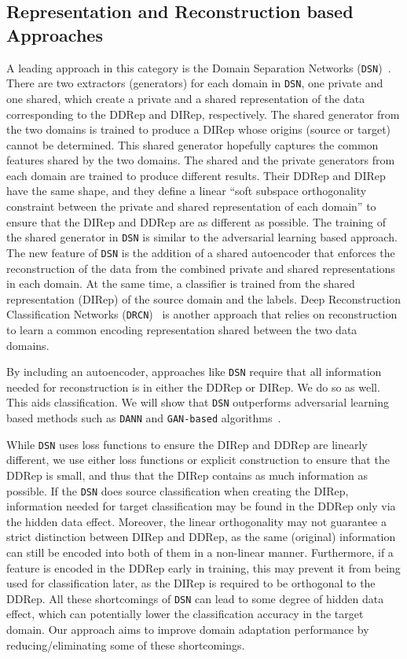 \documentclass{article}
\begin{document}
\subsection{Representation and Reconstruction based Approaches} \label{recon} A leading approach in this category is the Domain Separation Networks (\verb"DSN")~\cite{bousmalis2016domain}. There are two extractors (generators) for each domain in \verb"DSN", one private and one shared, which create a private and a shared representation of the data corresponding to the DDRep and DIRep, respectively. The shared generator from the two domains is trained to produce a DIRep whose origins (source or target) cannot be determined. This shared generator hopefully captures the common features shared by the two domains. The shared and the private generators from each domain are trained to produce different results. Their DDRep and DIRep have the same shape, and they define a linear ``soft subspace orthogonality constraint between the private and shared representation of each domain'' to ensure that the DIRep and DDRep are as different as possible. The training of the shared generator in \verb"DSN" is similar to the adversarial learning based approach. The new feature of \verb"DSN" is the addition of a shared autoencoder that enforces the reconstruction of the data from the combined private and shared representations in each domain. At the same time, a classifier is trained from the shared representation (DIRep) of the source domain and the labels. Deep Reconstruction Classification Networks (\verb"DRCN")~\cite{ghifary2016deep} is another approach
that relies on reconstruction to learn a common encoding representation shared between the two data domains.

By including an autoencoder, 
approaches like \verb"DSN" require that all information needed for reconstruction is in either the DDRep or DIRep. We do so as well. This aids classification. We will show that \verb"DSN" outperforms adversarial learning based methods such as \verb"DANN" and \verb"GAN-based" algorithms~\cite{singla2020preparing}. 

While \verb"DSN" uses loss functions to ensure the DIRep and DDRep are linearly different, we use either loss functions or explicit construction to ensure that the DDRep is small, and thus that the DIRep contains as much information as possible. If the \verb"DSN" does source classification when creating the DIRep, information needed for target classification may be found in the DDRep only via the hidden data effect. Moreover, the linear orthogonality may not guarantee a strict distinction between DIRep and DDRep, as the same (original) information can still be encoded into both of them in a non-linear manner. Furthermore, if a feature is encoded in the DDRep early in training, this may prevent it from being used for classification later, as the DIRep is required to be orthogonal to the DDRep. All these shortcomings of \verb"DSN" can lead to some degree of hidden data effect, which can potentially lower the classification accuracy in the target domain. Our approach aims to improve domain adaptation performance by reducing/eliminating some of these shortcomings. 
\end{document}
